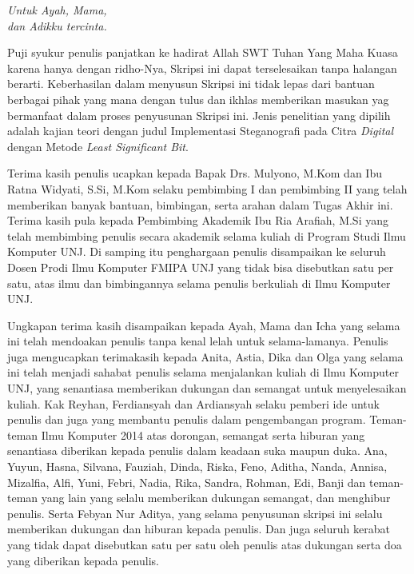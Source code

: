 \documentclass{jtetiskripsi}
\begin{document}
\cover



\acknowledgment
\begin{flushright}
	\emph{Untuk Ayah, Mama,\\dan Adikku tercinta.}
\end{flushright}
\preface

Puji syukur penulis panjatkan ke hadirat Allah SWT Tuhan Yang Maha Kuasa karena hanya dengan ridho-Nya, Skripsi ini dapat terselesaikan tanpa halangan berarti. Keberhasilan dalam menyusun Skripsi ini tidak lepas dari bantuan berbagai pihak yang mana dengan tulus dan ikhlas memberikan masukan yag bermanfaat dalam proses penyusunan Skripsi ini. Jenis penelitian yang dipilih adalah kajian teori dengan judul Implementasi Steganografi pada Citra \emph{Digital} dengan Metode \emph{Least Significant Bit}.

Terima kasih penulis ucapkan kepada Bapak Drs. Mulyono, M.Kom dan Ibu Ratna Widyati, S.Si, M.Kom selaku pembimbing I dan pembimbing II yang telah memberikan banyak bantuan, bimbingan, serta arahan dalam Tugas Akhir ini. Terima kasih pula kepada Pembimbing Akademik Ibu Ria Arafiah, M.Si yang telah membimbing penulis secara akademik selama kuliah di Program Studi Ilmu Komputer UNJ. Di samping itu penghargaan penulis disampaikan ke seluruh Dosen Prodi Ilmu Komputer FMIPA UNJ yang tidak bisa disebutkan satu per satu, atas ilmu dan bimbingannya selama penulis berkuliah di Ilmu Komputer UNJ. 

Ungkapan terima kasih disampaikan kepada Ayah, Mama dan Icha yang selama ini telah mendoakan penulis tanpa kenal lelah untuk selama-lamanya. Penulis juga mengucapkan terimakasih kepada Anita, Astia, Dika dan Olga yang selama ini telah menjadi sahabat penulis selama menjalankan kuliah di Ilmu Komputer UNJ, yang senantiasa memberikan dukungan dan semangat untuk menyelesaikan kuliah. Kak Reyhan, Ferdiansyah dan Ardiansyah selaku pemberi ide untuk penulis dan juga yang membantu penulis dalam pengembangan program. Teman-teman Ilmu Komputer 2014 atas dorongan, semangat serta hiburan yang senantiasa diberikan kepada penulis dalam keadaan suka maupun duka. Ana, Yuyun, Hasna, Silvana, Fauziah, Dinda, Riska, Feno, Aditha, Nanda, Annisa, Mizalfia, Alfi, Yuni, Febri, Nadia, Rika, Sandra, Rohman, Edi, Banji dan teman-teman yang lain yang selalu memberikan dukungan semangat, dan menghibur penulis. Serta Febyan Nur Aditya, yang selama penyusunan skripsi ini selalu memberikan dukungan dan hiburan kepada penulis. Dan juga seluruh kerabat yang tidak dapat disebutkan satu per satu oleh penulis atas dukungan serta doa yang diberikan kepada penulis.
\end{document}
